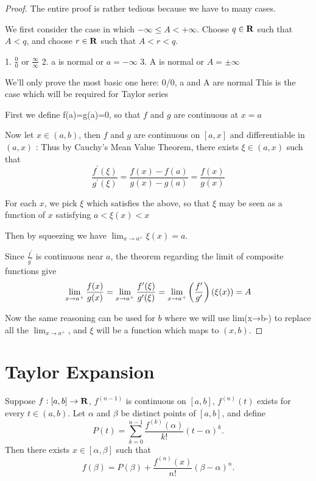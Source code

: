 \begin{proof}
The entire proof is rather tedious because we have to many cases.

We first consider the case in which $-\infty\le A<+\infty$. Choose $q\in\mathbf R$ such that $A<q$, and choose $r\in\mathbf R$ such that $A<r<q$.

1. $\frac{0}{0}$ or $\frac{\infty}{\infty}$
2. a is normal or $a=-\infty$
3. A is normal or $A=\pm\infty$



We'll only prove the most basic one here:
0/0, a and A are normal
This is the case which will be required for Taylor series

First we define f(a)=g(a)=0, so that $f$ and $g$ are continuous at $x=a$

Now let $x\in(a,b)$, then $f$ and $g$ are continuous on $[a,x]$ and differentiable in $(a,x)$
:
Thus by Cauchy's Mean Value Theorem, there exists $\xi\in(a,x)$ such that
\[ \frac{f^\prime(\xi)}{g^\prime(\xi)}=\frac{f(x)-f(a)}{g(x)-g(a)}=\frac{f(x)}{g(x)} \]

For each $x$, we pick $\xi$ which satisfies the above, so that $\xi$ may be seen as a function of $x$ satisfying $a<\xi(x)<x$

Then by squeezing we have $\lim_{x\to a^+}\xi(x)=a$.

Since $\frac{f^\prime}{g^\prime}$ is continuous near $a$, the theorem regarding the limit of composite functions give
\[ \lim_{x\to a^+}\frac{f(x)}{g(x)} = \lim_{x\to a^+}\frac{f'(\xi)}{g'(\xi)} = \lim_{x\to a^+}\left(\frac{f^\prime}{g^\prime}\right)(\xi(x)) = A \]

Now the same reasoning can be used for $b$ where we will use lim(x→b-) to replace all the $\lim_{x\to a^+}$, and $\xi$ will be a function which maps to $(x,b)$.
\end{proof}

\section{Taylor Expansion}
\begin{theorem}
Suppose $f:[a,b]\to\mathbf R$, $f^{(n-1)}$ is continuous on $[a,b]$, $f^{(n)}(t)$ exists for every $t\in(a,b)$. Let $\alpha$ and $\beta$ be distinct points of $[a,b]$, and define
\[P(t)=\sum_{k=0}^{n-1}\frac{f^{(k)}(\alpha)}{k!}(t-\alpha)^k.\]
Then there exists $x\in[\alpha,\beta]$ such that
\[f(\beta)=P(\beta)+\frac{f^{(n)}(x)}{n!}(\beta-\alpha)^n.\]
\end{theorem}



